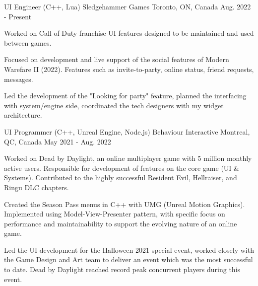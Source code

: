 

\begin{cventries}


  \cventry
{UI Engineer (C++, Lua)} %
{Sledgehammer Games} %
{Toronto, ON, Canada} %
{Aug. 2022 - Present} %
{
	\begin{cvitems} %
		\item Worked on Call of Duty franchise UI features designed to be maintained and used between games.
		\item Focused on development and live support of the social features of Modern Warefare II (2022). Features such as invite-to-party, online status, friend requests, messages.
		\item Led the development of the "Looking for party" feature, planned the interfacing with system/engine side, coordinated the tech designers with my widget architecture.
	\end{cvitems}
}
  \cventry
    {UI Programmer (C++, Unreal Engine, Node.js)} %
    {Behaviour Interactive} %
    {Montreal, QC, Canada} %
    {May 2021 - Aug. 2022} %
    {
      \begin{cvitems} %
\item Worked on Dead by Daylight, an online multiplayer game with 5 million monthly active users. Responsible for development of features on the core game (UI \& Systems). Contributed to the highly successful Resident Evil, Hellraiser, and Ringu DLC chapters.
\item Created the Season Pass menus in C++ with UMG (Unreal Motion Graphics). Implemented using Model-View-Presenter pattern, with specific focus on performance and maintainability to support the evolving nature of an online game.
\item Led the UI development for the Halloween 2021 special event, worked closely with the Game Design and Art team to deliver an event which was the most successful to date. Dead by Daylight reached record peak concurrent players during this event.

\end{cvitems}}
\end{cventries}

